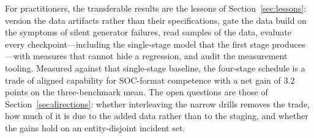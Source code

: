 \documentclass[twocolumn]{svjour3}
\begin{document}
For practitioners, the transferable results are the lessons of Section~\ref{sec:lessons}: version the data artifacts rather than their specifications, gate the data build on the symptoms of silent generator failures, read samples of the data, evaluate every checkpoint---including the single-stage model that the first stage produces---with measures that cannot hide a regression, and audit the measurement tooling. Measured against that single-stage baseline, the four-stage schedule is a trade of aligned capability for SOC-format competence with a net gain of 3.2 points on the three-benchmark mean. The open questions are those of Section~\ref{sec:directions}: whether interleaving the narrow drills removes the trade, how much of it is due to the added data rather than to the staging, and whether the gains hold on an entity-disjoint incident set.
\end{document}
